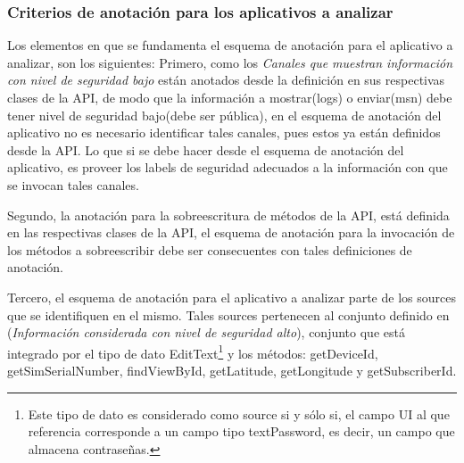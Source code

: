\subsubsection{Criterios de anotación para los aplicativos a analizar}
Los elementos en que se fundamenta el esquema de anotación para el aplicativo a
analizar, son los siguientes:\newline 
Primero, como los \textit{Canales que muestran
información con nivel de seguridad bajo} están anotados desde la definición en
sus respectivas clases de la API, de modo que la información a mostrar(logs) o
enviar(msn) debe tener nivel de seguridad bajo(debe ser pública), en el esquema
de anotación del aplicativo no es necesario identificar tales canales, pues
estos ya están definidos desde la API. Lo que si se debe hacer desde el esquema
de anotación del aplicativo, es proveer los labels de seguridad adecuados a la
información con que se invocan tales canales.

Segundo, la anotación para la sobreescritura de métodos de la API, está definida
en las respectivas clases de la API, el esquema de anotación para la invocación
de los métodos a sobreescribir debe ser consecuentes con tales definiciones de
anotación.

Tercero, el esquema de anotación para el aplicativo a analizar parte de
los sources que se identifiquen en el mismo. Tales sources pertenecen al conjunto
definido en (\textit{Información considerada con nivel de seguridad alto}),
conjunto que está integrado por el tipo de dato EditText\footnote{Este tipo de
dato es considerado como source si y sólo si, el campo UI al que referencia
corresponde a un campo tipo textPassword, es decir, un campo que almacena
contraseñas.} y los métodos: getDeviceId, getSimSerialNumber, findViewById,
getLatitude, getLongitude y getSubscriberId.

